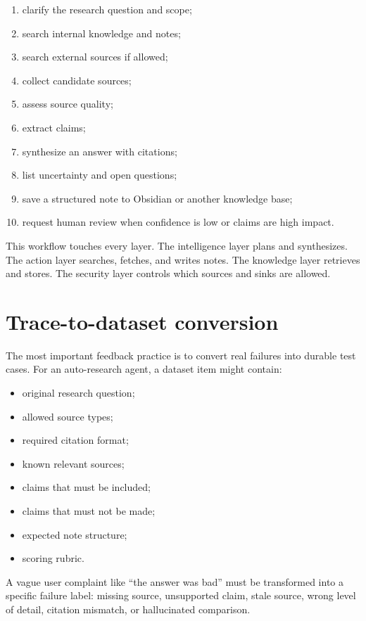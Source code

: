 \begin{enumerate}[leftmargin=*]
  \item clarify the research question and scope;
  \item search internal knowledge and notes;
  \item search external sources if allowed;
  \item collect candidate sources;
  \item assess source quality;
  \item extract claims;
  \item synthesize an answer with citations;
  \item list uncertainty and open questions;
  \item save a structured note to Obsidian or another knowledge base;
  \item request human review when confidence is low or claims are high impact.
\end{enumerate}

This workflow touches every layer. The intelligence layer plans and synthesizes. The action layer searches, fetches, and writes notes. The knowledge layer retrieves and stores. The security layer controls which sources and sinks are allowed.

\section{Trace-to-dataset conversion}

The most important feedback practice is to convert real failures into durable test cases. For an auto-research agent, a dataset item might contain:

\begin{itemize}[leftmargin=*]
  \item original research question;
  \item allowed source types;
  \item required citation format;
  \item known relevant sources;
  \item claims that must be included;
  \item claims that must not be made;
  \item expected note structure;
  \item scoring rubric.
\end{itemize}

A vague user complaint like ``the answer was bad'' must be transformed into a specific failure label: missing source, unsupported claim, stale source, wrong level of detail, citation mismatch, or hallucinated comparison.

